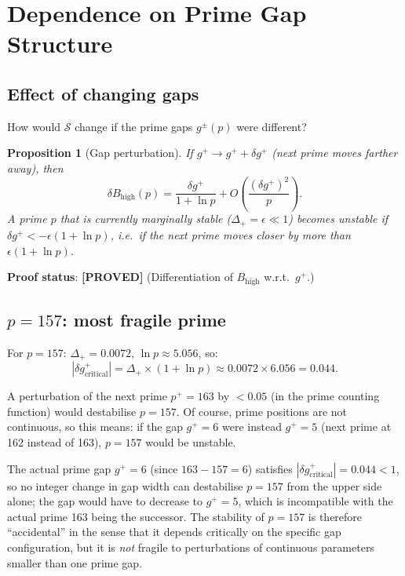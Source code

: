 \documentclass[11pt,a4paper]{article}
\newtheorem{proposition}{Proposition}
\newcommand{\proved}[1]{\textbf{[PROVED]} #1}
\newcommand{\Sc}{\mathcal{S}}
\begin{document}
\section{Dependence on Prime Gap Structure}

\subsection{Effect of changing gaps}

How would $\Sc$ change if the prime gaps $g^\pm(p)$ were different?

\begin{proposition}[Gap perturbation]
  If $g^+ \to g^+ + \delta g^+$ (next prime moves farther away), then
  \[
    \delta B_\mathrm{high}(p) = \frac{\delta g^+}{1+\ln p} + O\!\left(\frac{(\delta g^+)^2}{p}\right).
  \]
  A prime $p$ that is currently marginally stable ($\Delta_+ = \epsilon \ll 1$)
  becomes unstable if $\delta g^+ < -\epsilon(1+\ln p)$, i.e.\ if the next
  prime moves closer by more than $\epsilon(1+\ln p)$.
\end{proposition}

\textbf{Proof status}: \proved{} (Differentiation of $B_\mathrm{high}$ w.r.t.\ $g^+$.)

\subsection{$p = 157$: most fragile prime}

For $p = 157$: $\Delta_+ = 0.0072$, $\ln p \approx 5.056$, so:
\[
  |\delta g^+_\mathrm{critical}| = \Delta_+ \times (1+\ln p) \approx 0.0072 \times 6.056 = 0.044.
\]

A perturbation of the next prime $p^+ = 163$ by $< 0.05$ (in the prime counting
function) would destabilise $p = 157$.  Of course, prime positions are not
continuous, so this means: if the gap $g^+ = 6$ were instead $g^+ = 5$ (next prime
at 162 instead of 163), $p = 157$ would be unstable.

The actual prime gap $g^+ = 6$ (since $163 - 157 = 6$) satisfies
$|\delta g^+_\mathrm{critical}| = 0.044 < 1$, so no integer change in gap width
can destabilise $p = 157$ from the upper side alone; the gap would have to
decrease to $g^+ = 5$, which is incompatible with the actual prime 163 being
the successor.  The stability of $p = 157$ is therefore ``accidental'' in
the sense that it depends critically on the specific gap configuration,
but it is \emph{not} fragile to perturbations of continuous parameters
smaller than one prime gap.
\end{document}
